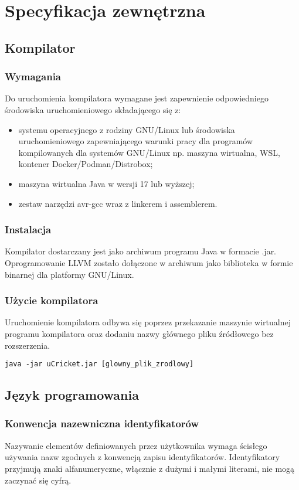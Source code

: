 \chapter{Specyfikacja zewnętrzna}
\label{ch:04}
\section{Kompilator}
\subsection{Wymagania}
Do uruchomienia kompilatora wymagane jest zapewnienie odpowiedniego środowiska uruchomieniowego składającego się z:
\begin{itemize}
\item systemu operacyjnego z rodziny GNU/Linux lub środowiska uruchomieniowego zapewniającego warunki pracy dla programów kompilowanych dla systemów GNU/Linux np. maszyna wirtualna, WSL, kontener Docker/Podman/Distrobox;
\item maszyna wirtualna Java w wersji 17 lub wyższej;
\item zestaw narzędzi avr-gcc wraz z linkerem i assemblerem.
\end{itemize}

\subsection{Instalacja}
Kompilator dostarczany jest jako archiwum programu Java w formacie .jar. Oprogramowanie LLVM zostało dołączone w archiwum jako biblioteka w formie binarnej dla platformy GNU/Linux.

\subsection{Użycie kompilatora}
Uruchomienie kompilatora odbywa się poprzez przekazanie maszynie wirtualnej programu kompilatora oraz dodaniu nazwy głównego pliku źródłowego bez rozszerzenia.
\begin{lstlisting}
java -jar uCricket.jar [glowny_plik_zrodlowy]
\end{lstlisting}

\section{Język programowania}
\subsection{Konwencja nazewniczna identyfikatorów}
Nazywanie elementów definiowanych przez użytkownika wymaga ścisłego używania nazw zgodnych z konwencją zapisu identyfikatorów. Identyfikatory przyjmują znaki alfanumeryczne, włącznie z dużymi i małymi literami, nie mogą zaczynać się cyfrą.

